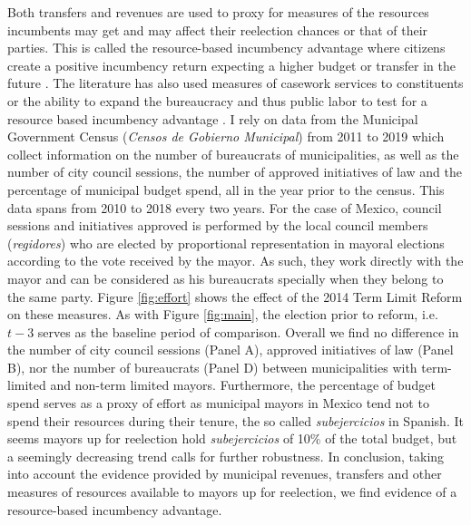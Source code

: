 \documentclass[12pt]{amsart}
\numberwithin{equation}{section}
\theoremstyle{definition}
\theoremstyle{definition}
\theoremstyle{definition}
\begin{document}
Both transfers and revenues are used to proxy for measures of the resources incumbents may get and may affect their reelection chances or that of their parties. This is called the resource-based incumbency advantage where citizens create a positive incumbency return expecting a higher budget or transfer in the future \citep{cox_morgensten_1993}. The literature has also used measures of casework services to constituents or the ability to expand the bureaucracy and thus public labor to test for a resource based incumbency advantage \citep{cox_katz_1996}. I rely on data from the Municipal Government Census (\emph{Censos de Gobierno Municipal}) from 2011 to 2019 which collect information on the number of bureaucrats of municipalities, as well as the number of city council sessions, the number of approved initiatives of law and the percentage of municipal budget spend, all in the year prior to the census. This data spans from 2010 to 2018 every two years. For the case of Mexico, council sessions and initiatives approved is performed by the local council members (\emph{regidores}) who are elected by proportional representation in mayoral elections according to the vote received by the mayor. As such, they work directly with the mayor and can be considered as his bureaucrats specially when they belong to the same party. Figure \ref{fig:effort} shows the effect of the 2014 Term Limit Reform on these measures. As with Figure \ref{fig:main}, the election prior to reform, i.e. $t-3$ serves as the baseline period of comparison. Overall we find no difference in the number of city council sessions (Panel A), approved initiatives of law (Panel B), nor the number of bureaucrats (Panel D) between municipalities with term-limited and non-term limited mayors. Furthermore, the percentage of budget spend serves as a proxy of effort as municipal mayors in Mexico tend not to spend their resources during their tenure, the so called \emph{subejercicios} in Spanish. It seems mayors up for reelection hold \emph{subejercicios} of 10\% of the total budget, but a seemingly decreasing trend calls for further robustness. In conclusion, taking into account the evidence provided by municipal revenues, transfers and other measures of resources available to mayors up for reelection, we find evidence of a resource-based incumbency advantage.
\end{document}
